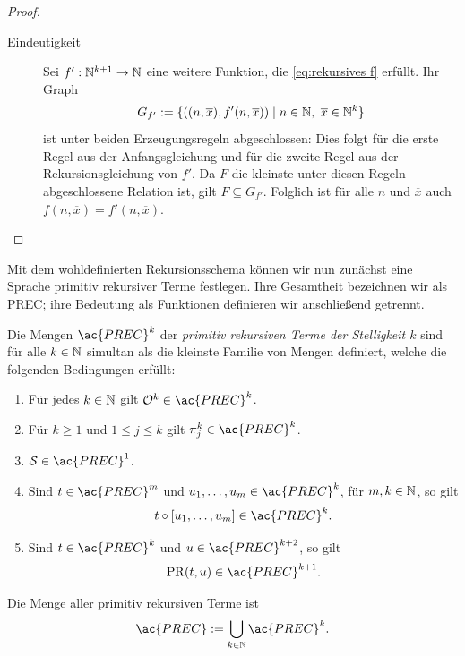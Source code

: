 \begin{proof}
\begin{description}
	\item[Eindeutigkeit]
		Sei $f':\mathbb{N}^{k+1}\to\mathbb{N}$ eine weitere Funktion, die
		\eqref{eq:rekursives f} erfüllt. Ihr Graph
		\[
			G_{f'}
			:=\{((n,\overline{x}),f'(n,\overline{x}))
			\mid n\in\mathbb{N},\ \overline{x}\in\mathbb{N}^k\}
		\]
		ist unter beiden Erzeugungsregeln abgeschlossen: Dies folgt für die
		erste Regel aus der Anfangsgleichung und für die zweite Regel aus der
		Rekursionsgleichung von $f'$.
		Da $F$ die kleinste unter diesen Regeln abgeschlossene Relation ist,
		gilt $F\subseteq G_{f'}$. Folglich ist für alle $n$ und
		$\overline{x}$ auch $f(n,\overline{x})=f'(n,\overline{x})$.
	\end{description}
\end{proof}
Mit dem wohldefinierten Rekursionsschema können wir nun zunächst eine Sprache
primitiv rekursiver Terme festlegen. Ihre Gesamtheit bezeichnen wir als
\acf{PREC}; ihre Bedeutung als Funktionen definieren wir anschließend getrennt.
\begin{Def}[name={Syntax der \acs*{PREC}}]\label{def:PREC}
	Die Mengen $\ac{PREC}^k$ der \emph{primitiv rekursiven Terme der Stelligkeit
	$k$} sind für alle $k\in\mathbb{N}$ simultan als die kleinste Familie von Mengen
	definiert, welche die folgenden Bedingungen erfüllt:
	\begin{enumerate}
	\item\label{itm:Nullfunktion}
		Für jedes $k\in\mathbb{N}$ gilt $\mathcal{O}^k\in\ac{PREC}^k$.
	\item\label{itm:Projektion}
		Für $k\geq1$ und $1\leq j\leq k$ gilt
		$\pi_j^k\in\ac{PREC}^k$.
	\item\label{itm:Nachfolgerfunktion}
		$\mathcal{S}\in\ac{PREC}^1$.
	\item\label{itm:Komposition}
		Sind $t\in\ac{PREC}^m$ und
		$u_1,\dots,u_m\in\ac{PREC}^k$, für $m, k \in\mathbb{N}$, so gilt
		\[
			t\circ[u_1,\dots,u_m]\in\ac{PREC}^k.
		\]
	\item\label{itm:Rekursion}
		Sind $t\in\ac{PREC}^k$ und $u\in\ac{PREC}^{k+2}$, so gilt
		\[
			\PR(t,u)\in\ac{PREC}^{k+1}.
		\]
	\end{enumerate}
	Die Menge aller primitiv rekursiven Terme ist
	\[
		\ac{PREC}:=\bigcup_{k\in\N}\ac{PREC}^k.
	\]
\end{Def}

